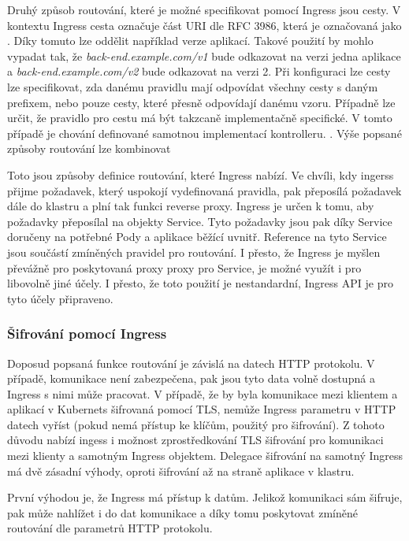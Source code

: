 Druhý způsob routování, které je možné specifikovat pomocí Ingress jsou cesty. V kontextu Ingress cesta označuje část URI dle RFC 3986, která je označovaná jako . Díky tomuto lze oddělit například verze aplikací. Takové použití by mohlo vypadat tak, že \textit{back-end.example.com/v1} bude odkazovat na verzi jedna aplikace a \textit{back-end.example.com/v2} bude odkazovat na verzi 2. Při konfiguraci lze cesty lze specifikovat, zda danému pravidlu mají odpovídat všechny cesty s daným prefixem, nebo pouze cesty, které přesně odpovídají danému vzoru. Případně lze určit, že pravidlo pro cestu má být takzcaně implementačně specifické. V tomto případě je chování definované samotnou implementací kontrolleru. \cite{thekubernetesauthors_2022_ingress}. Výše popsané způsoby routování lze kombinovat

Toto jsou způsoby definice routování, které Ingress nabízí. Ve chvíli, kdy ingerss přijme požadavek, který uspokojí vydefinovaná pravidla, pak přeposílá požadavek dále do klastru a plní tak funkci reverse proxy. Ingress je určen k tomu, aby požadavky přeposílal na objekty Service. Tyto požadavky jsou pak díky Service doručeny na potřebné Pody a aplikace běžící uvnitř. Reference na tyto Service jsou součástí zmíněných pravidel pro routování. I přesto, že Ingress je myšlen převážně pro poskytovaná proxy proxy pro Service, je možné využít i pro libovolně jiné účely. I přesto, že toto použití je nestandardní, Ingress API je pro tyto účely připraveno.

\subsubsection{Šifrování pomocí Ingress}
Doposud popsaná funkce routování je závislá na datech HTTP protokolu. V případě, komunikace není zabezpečena, pak jsou tyto data volně dostupná a Ingress s nimi může pracovat. V případě, že by byla komunikace mezi klientem a aplikací v Kubernets šifrovaná pomocí TLS, nemůže Ingress parametru v HTTP datech vyříst (pokud nemá přístup ke klíčům, použitý pro šifrování). Z tohoto důvodu nabízí ingess i možnost zprostředkování TLS šifrování pro komunikaci mezi klienty a samotným Ingress objektem. Delegace šifrování na samotný Ingress má dvě zásadní výhody, oproti šifrování až na straně aplikace v klastru. \cite{poulton_2022_the}

První výhodou je, že Ingress má přístup k datům. Jelikož komunikaci sám šifruje, pak může nahlížet i do dat komunikace a díky tomu poskytovat zmíněné routování dle parametrů HTTP protokolu.

